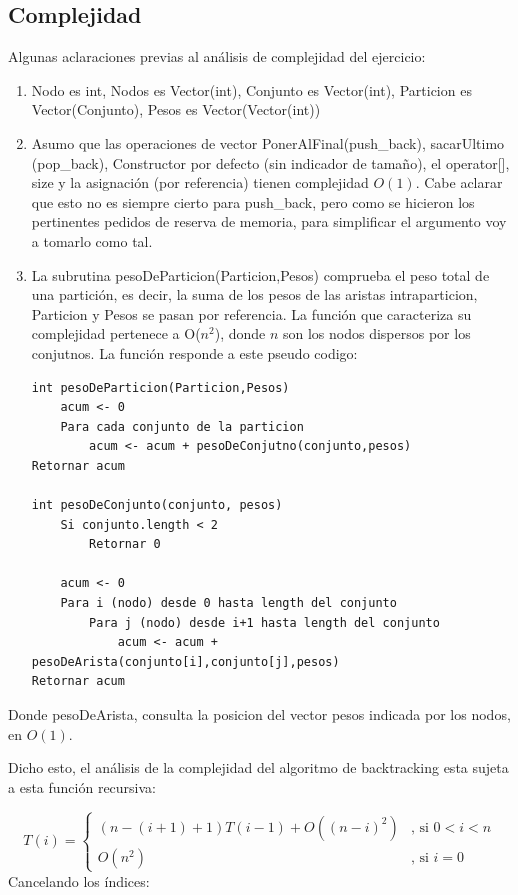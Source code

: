 \subsection{Complejidad}

Algunas aclaraciones previas al análisis de complejidad del ejercicio:

\begin{enumerate}

\item Nodo es int, Nodos es Vector(int), Conjunto es Vector(int), Particion es Vector(Conjunto), Pesos es Vector(Vector(int))
\item Asumo que las operaciones de vector PonerAlFinal(push\_back), sacarUltimo (pop\_back), Constructor por defecto (sin indicador de tamaño), el operator[], size y la asignación (por referencia) tienen complejidad $O(1)$. Cabe aclarar que esto no es siempre cierto para push\_back, pero como se hicieron los pertinentes pedidos de reserva de memoria, para simplificar el argumento voy a tomarlo como tal.
\item La subrutina pesoDeParticion(Particion,Pesos) comprueba el peso total de una partición, es decir, la suma de los pesos de las aristas intraparticion, Particion y Pesos se pasan por referencia. La función que caracteriza su complejidad pertenece a O($n^2$), donde $n$ son los nodos dispersos por los conjutnos. La función responde a este pseudo codigo:
\bigskip
\begin{lstlisting}
int pesoDeParticion(Particion,Pesos)
	acum <- 0
	Para cada conjunto de la particion
		acum <- acum + pesoDeConjutno(conjunto,pesos)
Retornar acum

int pesoDeConjunto(conjunto, pesos)
	Si conjunto.length < 2
		Retornar 0

	acum <- 0
	Para i (nodo) desde 0 hasta length del conjunto
		Para j (nodo) desde i+1 hasta length del conjunto
			acum <- acum + pesoDeArista(conjunto[i],conjunto[j],pesos)
Retornar acum
\end{lstlisting}
\end{enumerate}

Donde pesoDeArista, consulta la posicion del vector pesos indicada por los nodos, en $O(1)$.

Dicho esto, el análisis de la complejidad del algoritmo de backtracking esta sujeta a esta función recursiva:

\[ T(i) = \left\{ \begin{array}{ll}
         (n-(i+1)+1)T(i-1) + O((n-i)^2) & \mbox{, si $0 < i < n$}\\
         O(n^2) & \mbox{, si $i = 0$}\end{array} \right. \]
Cancelando los índices:

